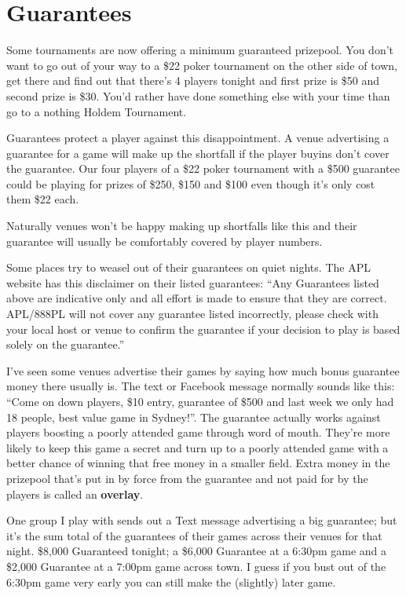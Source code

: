 \section{Guarantees}

Some tournaments are now offering a minimum guaranteed prizepool. You
don't want to go out of your way to a \$22 poker tournament on the
other side of town, get there and find out that there's 4 players tonight
and first prize is \$50 and second prize is \$30. You'd rather have
done something else with your time than go to a nothing Holdem Tournament.

Guarantees protect a player against this disappointment. A venue
advertising a guarantee for a game will make up the shortfall if the
player buyins don't cover the guarantee. Our four players of a \$22
poker tournament with a \$500 guarantee could be playing for prizes
of \$250, \$150 and \$100 even though it's only cost them \$22 each.

Naturally venues won't be happy making up shortfalls like this and
their guarantee will usually be comfortably covered by player numbers.

Some places try to weasel out of their guarantees on quiet nights.
The APL website has this disclaimer on their listed guarantees:
``Any Guarantees listed above are indicative only and all effort
is made to ensure that they are correct. APL/888PL will not cover
any guarantee listed incorrectly, please check with your local
host or venue to confirm the guarantee if your decision to
play is based solely on the guarantee.''

I've seen some venues advertise their games by saying how much bonus
guarantee money there usually is. The text or Facebook message
normally sounds like this: ``Come on down players, \$10 entry,
guarantee of \$500 and last week we only had 18 people, best value
game in Sydney!''. The guarantee actually works against players
boosting a poorly attended game through word of
mouth. They're more likely to keep this game a secret and turn up to a
poorly attended game with a better chance of winning that free money
in a smaller field. Extra money in the prizepool that's put in by force
from the guarantee and not paid for by the players is called an
\textbf{overlay}.

One group I play with sends out a Text message advertising a big
guarantee; but it's the sum total of the guarantees of their games
across their venues for that night. \$8,000 Guaranteed tonight; a
\$6,000 Guarantee at a 6:30pm game and a \$2,000 Guarantee at
a 7:00pm game across town. I guess if you bust out of the 6:30pm game
very early you can still make the (slightly) later game.

